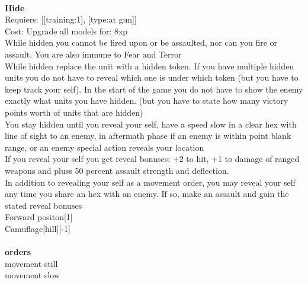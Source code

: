 \ \\
{\bf Hide } \\

Requiers: [[training:1], [type:at gun]] \\
Cost: Upgrade all models for: 8xp \\
While hidden you cannot be fired upon or be assaulted, nor can you fire or assault. You are also immune to Fear and Terror\\ 
While hidden replace the unit with a hidden token. If you have multiple hidden units you do not have to reveal which one is under which token (but you have to keep track your self). In the start of the game you do not have to show the enemy exactly what units you have hidden. (but you have to state how many victory points worth of units that are hidden)\\ 
You stay hidden until you reveal your self, have a speed slow in a clear hex with line of sight to an enemy, in aftermath phase if an enemy is within point blank range, or an enemy special action reveals your location\\ 
If you reveal your self you get reveal bonuses: +2 to hit, +1 to damage of ranged weapons and pluss 50 percent assault strength and deflection.\\ 
In addition to revealing your self as a movement order, you may reveal your self any time you share an hex with an enemy. If so, make an assault and gain the stated reveal bonuses\\ 
Forward positon[1]\\ 
Camuflage[hill][-1]\\ 








\ \\ {\bf orders } \\
movement still \\
movement slow \\

